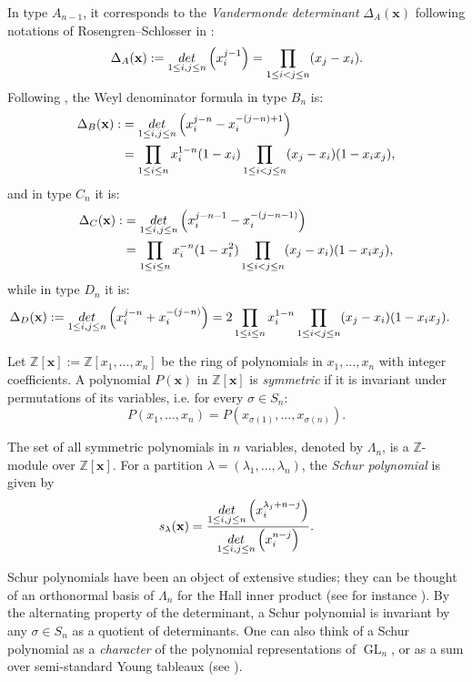\documentclass[11pt,letterpaper]{amsart}
\def\bbbz{\mathbb Z}
\def\det{{\rm det}}
\DeclareMathOperator{\GL}{GL}
\numberwithin{equation}{section}
\numberwithin{df}{section}
\begin{document}
 In type $A_{n-1}$, it corresponds to the \textit{Vandermonde determinant} $\Delta_A(\textbf{x})$ following notations of Rosengren--Schlosser in \cite{RS}:
\begin{equation}\label{chap2:delta}
\Delta_A(\mathbf{x}):=\underset{1\le i,j\le n}{\det}\left(x_i^{j-1}\right)=\prod_{1\le i<j\le n}(x_j-x_i).
\end{equation}
Following \cite{RS}, the Weyl denominator formula in type $B_n$ is:
\begin{align}\label{def:deltab}
\Delta_B(\mathbf{x}):&=\underset{1\le i,j\le n}{\det}\left(x_i^{j-n}-x_i^{-(j-n)+1}\right)\notag\\
&=\prod_{1\le i \le n}x_i^{1-n}(1-x_i)\prod_{1\le i<j\le n}(x_j-x_i)(1-x_ix_j),
\end{align}
and in type $C_n$ it is:
\begin{align}\label{def:deltac}
\Delta_C(\mathbf{x}):&=\underset{1\le i,j\le n}{\det}\left(x_i^{j-n-1}-x_i^{-(j-n-1)}\right)\notag
\\&=\prod_{1\le i \le n}x_i^{-n}(1-x_i^2)\prod_{1\le i<j\le n}(x_j-x_i)(1-x_ix_j),
\end{align}
while in type $D_n$ it is:
\begin{align}\label{def:deltad}
\Delta_D(\mathbf{x})&:=\underset{1\le i,j\le n}{\det}\left(x_i^{j-n}+x_i^{-(j-n)}\right)=2\prod_{1\le i \le n}x_i^{1-n}\prod_{1\le i<j\le n}(x_j-x_i)(1-x_ix_j).
\end{align}

 Let $\bbbz[\mathbf{x}]:=\bbbz[x_1,\dots,x_n]$ be the ring of polynomials in $x_1,\dots,x_n$ with integer coefficients. A polynomial $P(\mathbf{x})$ in $\bbbz[\mathbf{x}]$ is \textit{symmetric} if it is invariant under permutations of its variables, i.e. for every $\sigma\in S_n$:
$$P(x_1,\dots,x_n)=P\left(x_{\sigma(1)},\dots,x_{\sigma(n)}\right).$$

The set of all symmetric polynomials in $n$ variables, denoted by $\Lambda_n$, is a $\bbbz$-module over $\bbbz[\textbf{x}]$. For a partition $\lambda=(\lambda_1,\dots,\lambda_n)$, the \emph{Schur polynomial} is given by
\begin{equation}
\label{gldef}
s_\lambda(\mathbf{x})=\frac{\underset{1\le i,j\le n}{\det}\left(x_i^{\lambda_j+n-j}\right)}
{\underset{1\le i,j\le n}{\det}\left(x_i^{n-j}\right)}.
\end{equation}

Schur polynomials have been an object of extensive studies; they can be thought of an orthonormal basis of $\Lambda_n$ for the Hall inner product (see for instance \cite{Macbook}). By the alternating property of the determinant, a Schur polynomial is invariant by any $\sigma\in S_n$ as a quotient of determinants. One can also think of a Schur polynomial as a \emph{character} of the polynomial representations of $\GL_n$, or as a sum over semi-standard Young tableaux (see \cite{FH}).
\end{document}
